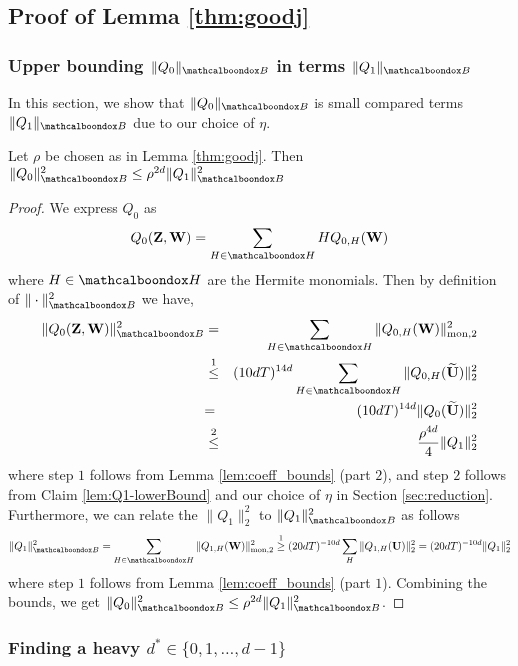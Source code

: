 \subsection{Proof of Lemma \ref{thm:goodj}}

\subsubsection{Upper bounding $\|Q_0\|_\basisA$ in terms $\|Q_1\|_\basisA$}		\label{sec:Q0Q1-comparison}
  In this section, we show that $\|Q_0\|_\basisA$ is small compared  terms $\|Q_1\|_\basisA$ due to our choice of $\eta$. 
	\begin{lemma}				\label{lem:Q0-Q1-bound}
		Let $\rho$ be chosen as in Lemma \ref{thm:goodj}. Then $\|Q_0\|^2_\basisA \le \rho^{2d}\|Q_1\|^2_\basisA$
	\end{lemma}
  \begin{proof}
	We express $Q_0$ as 
	\begin{equation*}
	Q_0({\bf Z},{\bf W}) = \sum_{H \in \mcb{H}} H Q_{0,H}({\bf W})
	\end{equation*}
	where $H \in \mcb{H}$ are the Hermite monomials. Then by definition of $\|\cdot\|^2_\basisA$ we have,
	\begin{eqnarray*}
		\|Q_0({\bf Z},{\bf W})\|^2_\basisA &=& \sum_{H \in \mcb{H}} \|Q_{0,H}({\bf W})\|^2_{\rm mon,2} \\
		&\overset{1}{\le} & (10dT)^{14d}\sum_{H \in \mcb{H}} \|Q_{0,H}(\Wu)\|^2_{2} \\
		&{=} & (10dT)^{14d}\|Q_0(\Wu)\|^2_{2} \\
		&\overset{2}{\le} & \frac{\rho^{4d}}{4}\|Q_1\|^2_{2} 
	\end{eqnarray*}
	\noindent where step $1$ follows from Lemma \ref{lem:coeff_bounds} (part $2$), and step $2$ follows from Claim \ref{lem:Q1-lowerBound} and our choice of $\eta$ in Section \ref{sec:reduction}. Furthermore, we can relate the $\|Q_1\|^2_2$ to $\|Q_1\|^2_\basisA$ as follows
	\begin{equation*}				
	\|Q_1\|^2_\basisA = \sum_{H \in \mcb{H}}\|Q_{1,H}({\bf W})\|^2_{\rm mon,2} \overset{1}{\ge} (20dT)^{-10d}\sum_H\|Q_{1,H}({\bf U})\|^2_2
	=  (20dT)^{-10d}\|Q_1\|^2_2 
	\end{equation*}
	\noindent where step $1$ follows from Lemma \ref{lem:coeff_bounds} (part $1$). Combining the bounds, we get $\|Q_0\|^2_\basisA \le \rho^{2d}\|Q_1\|^2_\basisA$.
	\end{proof}
\subsubsection{Finding a heavy $d^* \in \{0,1,\ldots,d-1\}$}

